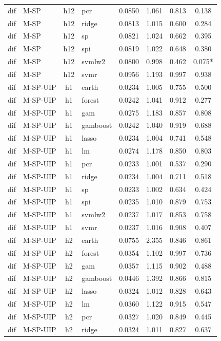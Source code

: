 \begin{ThreePartTable}
\begin{longtable}[t]{llclcccc}
dif & M-SP & h12 & pcr & 0.0850 & 1.061 & 0.813 & 0.138\\
dif & M-SP & h12 & ridge & 0.0813 & 1.015 & 0.600 & 0.284\\
dif & M-SP & h12 & sp & 0.0821 & 1.024 & 0.662 & 0.395\\
dif & M-SP & h12 & spi & 0.0819 & 1.022 & 0.648 & 0.380\\
dif & M-SP & h12 & svmlw2 & 0.0800 & 0.998 & 0.462 & 0.075*\\
dif & M-SP & h12 & svmr & 0.0956 & 1.193 & 0.997 & 0.938\\
\addlinespace
dif & M-SP-UIP & h1 & earth & 0.0234 & 1.005 & 0.755 & 0.500\\
dif & M-SP-UIP & h1 & forest & 0.0242 & 1.041 & 0.912 & 0.277\\
dif & M-SP-UIP & h1 & gam & 0.0275 & 1.183 & 0.857 & 0.808\\
dif & M-SP-UIP & h1 & gamboost & 0.0242 & 1.040 & 0.919 & 0.688\\
dif & M-SP-UIP & h1 & lasso & 0.0234 & 1.004 & 0.741 & 0.548\\
dif & M-SP-UIP & h1 & lm & 0.0274 & 1.178 & 0.850 & 0.803\\
dif & M-SP-UIP & h1 & pcr & 0.0233 & 1.001 & 0.537 & 0.290\\
dif & M-SP-UIP & h1 & ridge & 0.0234 & 1.004 & 0.711 & 0.518\\
dif & M-SP-UIP & h1 & sp & 0.0233 & 1.002 & 0.634 & 0.424\\
dif & M-SP-UIP & h1 & spi & 0.0235 & 1.010 & 0.879 & 0.753\\
dif & M-SP-UIP & h1 & svmlw2 & 0.0237 & 1.017 & 0.853 & 0.758\\
dif & M-SP-UIP & h1 & svmr & 0.0237 & 1.016 & 0.908 & 0.407\\
\addlinespace
dif & M-SP-UIP & h2 & earth & 0.0755 & 2.355 & 0.846 & 0.861\\
dif & M-SP-UIP & h2 & forest & 0.0354 & 1.102 & 0.997 & 0.736\\
dif & M-SP-UIP & h2 & gam & 0.0357 & 1.115 & 0.902 & 0.488\\
dif & M-SP-UIP & h2 & gamboost & 0.0446 & 1.392 & 0.866 & 0.815\\
dif & M-SP-UIP & h2 & lasso & 0.0324 & 1.012 & 0.828 & 0.643\\
dif & M-SP-UIP & h2 & lm & 0.0360 & 1.122 & 0.915 & 0.547\\
dif & M-SP-UIP & h2 & pcr & 0.0327 & 1.020 & 0.849 & 0.445\\
dif & M-SP-UIP & h2 & ridge & 0.0324 & 1.011 & 0.827 & 0.637\\

\end{longtable}
\end{ThreePartTable}
